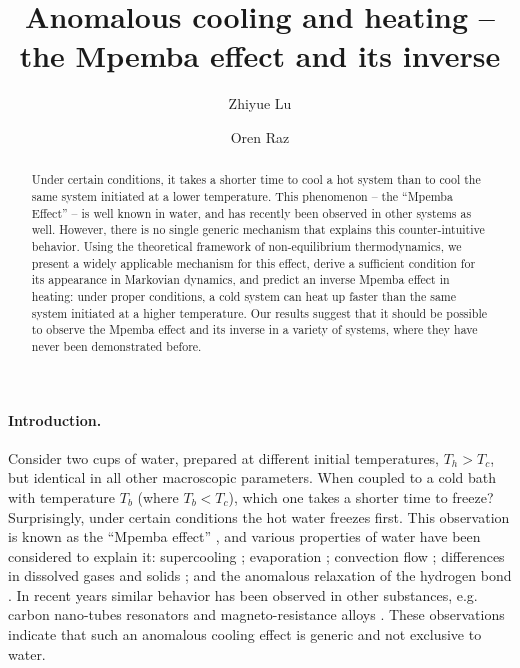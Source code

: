 \documentclass[a4paper,draft,aps,prl,preprint,superscriptaddress,nofootinbib]{revtex4}
\begin{document}
\author{Zhiyue Lu}
\author{Oren Raz}
\title{Anomalous cooling and heating -- the Mpemba effect and its inverse}
\begin{abstract}
Under certain conditions, it takes a shorter time to cool a hot system than to cool the same system initiated at a lower temperature. This phenomenon -- the ``Mpemba Effect'' -- is well known in water, and has recently been observed in other systems as well. However, there is  no single generic mechanism that explains this counter-intuitive behavior. Using the theoretical framework of non-equilibrium thermodynamics, we present a widely applicable mechanism for this effect,  derive a sufficient condition for its appearance in Markovian dynamics, and predict an inverse Mpemba effect in heating:  under proper conditions, a cold system can heat up faster than the same system initiated at a higher temperature. Our results suggest that it should be possible to observe the Mpemba effect and its inverse in a variety of systems, where they have never been demonstrated before. 
\end{abstract}
\maketitle
\paragraph{Introduction.}
		Consider two cups of water, prepared at different initial temperatures, $T_h>T_c$, but identical in all other macroscopic parameters. When coupled to a cold bath with temperature $T_b$ (where $T_b<T_{c}$), which one takes a shorter time to freeze?  Surprisingly, under certain conditions the hot water freezes first. This observation is known as the ``Mpemba effect'' \cite{AmJPhys_General_jeng2006mpemba}, and various properties of water have been considered to explain it: supercooling \cite{SupperCooling_auerbach1995supercooling,Experiment_esposito2008mpemba}; evaporation \cite{Theory_Evap_Colling_vynnycky2010evaporative,Theory_evaporation_kell1968freezing}; convection flow \cite{Theory_NotOnlyConv_vynnycky2015can}; differences in dissolved gases and solids \cite{Exp_GassesEff_wojciechowski1988freezing,Disolved_katz2009hot}; and the anomalous relaxation of the hydrogen bond \cite{Theory_HydroBond_zhang2014hydrogen,Molecular_Dynamics_jin2015mechanisms}. 
		 In recent years similar behavior has been observed in other substances, e.g. carbon nano-tubes resonators \cite{Theory_Carbon_nano_greaney2011mpemba} and magneto-resistance alloys \cite{Magnetic_banerjee2011history}. These observations indicate that such an anomalous cooling effect is generic and not exclusive to water. 
		 
\end{document}
